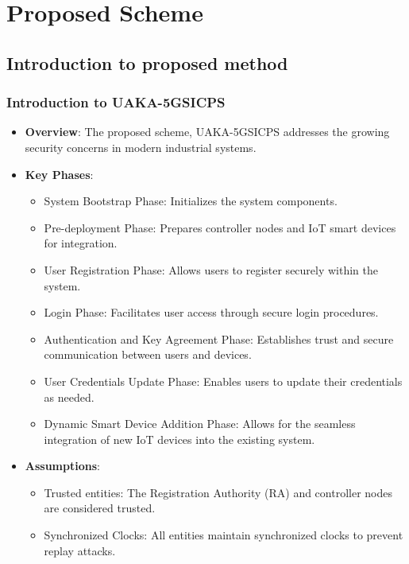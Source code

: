 \documentclass[9pt,handout]{beamer}
\begin{document}
\section{Proposed Scheme}
\subsection{Introduction to proposed method}
\begin{frame}
    \frametitle{Introduction to UAKA-5GSICPS}
    \begin{itemize}
        \item \textbf{Overview}: The proposed scheme, UAKA-5GSICPS addresses the growing security concerns in modern industrial systems.
        
        \item \textbf{Key Phases}:
        \begin{itemize}
            \item System Bootstrap Phase: Initializes the system components.
            \item Pre-deployment Phase: Prepares controller nodes and IoT smart devices for integration.
            \item User Registration Phase: Allows users to register securely within the system.
            \item Login Phase: Facilitates user access through secure login procedures.
            \item Authentication and Key Agreement Phase: Establishes trust and secure communication between users and devices.
            \item User Credentials Update Phase: Enables users to update their credentials as needed.
            \item Dynamic Smart Device Addition Phase: Allows for the seamless integration of new IoT devices into the existing system.
        \end{itemize}

        \item \textbf{Assumptions}:
        \begin{itemize}
            \item Trusted entities: The Registration Authority (RA) and controller nodes are considered trusted.
            \item Synchronized Clocks: All entities maintain synchronized clocks to prevent replay attacks.
        \end{itemize}
    \end{itemize}
\end{frame}
\end{document}
